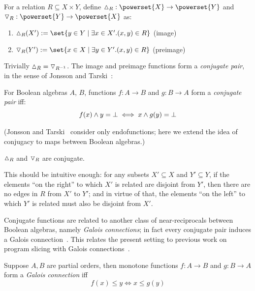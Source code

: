 \begin{definition}
   For a relation $R \subseteq X \times Y$, define $\demandedByR_R: \powerset{X} \to \powerset{Y}$ and
   $\demandsR_R : \powerset{Y} \to \powerset{X}$ as:
   \begin{enumerate}
      \item $\demandedByR_{R}(X') \eqdef \set{y \in Y \mid \exists x \in X'.(x,y) \in R}$ \hfill (image)
      \item $\demandsR_{R}(Y') \eqdef \set{x \in X \mid \exists y \in Y'. (x,y) \in R}$ \hfill (preimage)
   \end{enumerate}
\end{definition}

\noindent Trivially $\demandedByR_{R} = \demandsR_{R^{-1}}$. The image and preimage functions form a
\textit{conjugate pair}, in the sense of Jonsson and Tarski~\cite{jonsson51}:

\begin{definition}
   For Boolean algebras $A$, $B$, functions $f: A \to B$ and $g: B \to A$ form a \textit{conjugate pair} iff:
   $$
   f(x) \wedge y = \bot \iff x \wedge g(y) = \bot
   $$
\end{definition}

\noindent (Jonsson and Tarski~\cite{jonsson51} consider only endofunctions; here we extend the idea of
conjugacy to maps between Boolean algebras.)

\begin{lemma}
\label{lem:im-preim-conjugate}
$\demandedByR_{R}$ and $\triangledown_{R}$ are conjugate.
\end{lemma}

This should be intuitive enough: for any subsets $X' \subseteq X$ and $Y' \subseteq Y$, if the elements ``on
the right'' to which $X'$ is related are disjoint from $Y'$, then there are no edges in $R$ from $X'$ to $Y'$;
and in virtue of that, the elements ``on the left'' to which $Y'$ is related must also be disjoint from $X'$.

Conjugate functions are related to another class of near-reciprocals between Boolean algebras, namely
\emph{Galois connections}; in fact every conjugate pair induces a Galois connection~\cite{menni14}. This
relates the present setting to previous work on program slicing with Galois
connections~\cite{perera12a,perera16d,ricciotti17}.

\begin{definition}
   \label{def:conjugate:galois-connection}
   Suppose $A, B$ are partial orders, then monotone functions $f: A \to B$ and $g: B \to A$ form a \textit{Galois
   connection} iff
   \[ f(x) \leq y \iff x \leq g(y) \]
\end{definition}

